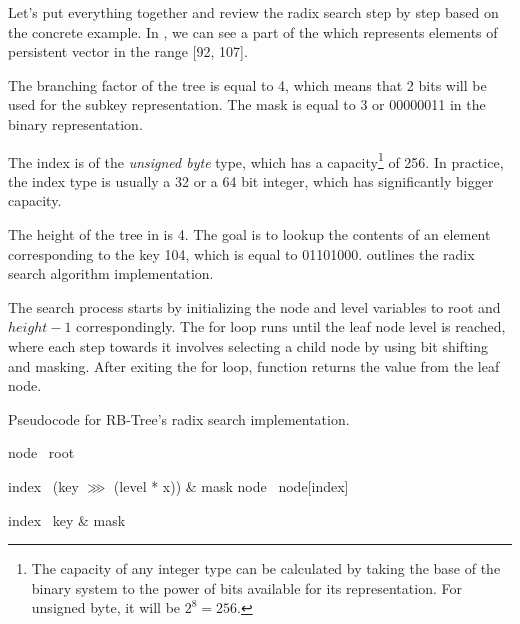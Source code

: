 \begin{figure}
\end{figure}

Let's put everything together and review the radix search step by step based on the concrete example. In , we can see a part of the \rbtree{} which represents elements of persistent vector in the range [92, 107].

The branching factor of the tree is equal to 4, which means that 2 bits will be used for the subkey representation. The mask is equal to 3 or 00000011 in the binary representation.

The index is of the \emph{unsigned byte} type, which has a capacity\footnote{The capacity of any integer type can be calculated by taking the base of the binary system to the power of bits available for its representation. For unsigned byte, it will be $2^8 = 256$.} of 256. In practice, the index type is usually a 32 or a 64 bit integer, which has significantly bigger capacity.

The height of the tree in  is 4. The goal is to lookup the contents of an element corresponding to the key 104, which is equal to 01101000.  outlines the radix search algorithm implementation.

The search process starts by initializing the node and level variables to root and $height - 1$ correspondingly. The for loop runs until the leaf node level is reached, where each step towards it involves selecting a child node by using bit shifting and masking. After exiting the for loop, function returns the value from the leaf node.

\begin{listing}[ht!]
    \caption{Pseudocode for RB-Tree's radix search implementation.}
    \label{lst:rb-tree-radix-search}

    \begin{algorithmic}
            \State node \la\ root

                \State index \la\ (key $\ggg$ (level * x)) \& mask
                \State node \la\ node[index]
            \EndFor

            \State index \la\ key \& mask
            \State {}
        \EndFunction
    \end{algorithmic}
\end{listing}

